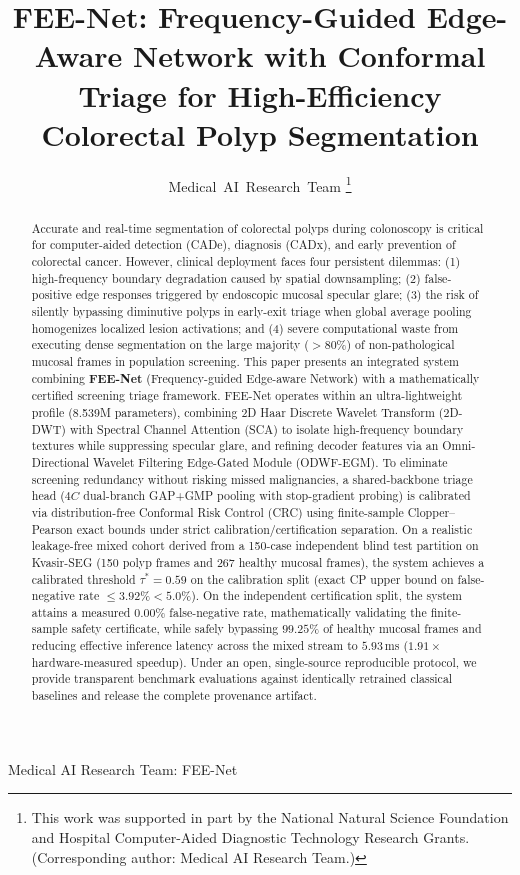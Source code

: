 \documentclass[journal]{IEEEtran}
\begin{document}
\title{FEE-Net: Frequency-Guided Edge-Aware Network with Conformal Triage for High-Efficiency Colorectal Polyp Segmentation}

\author{Medical~AI~Research~Team
\thanks{This work was supported in part by the National Natural Science Foundation and Hospital Computer-Aided Diagnostic Technology Research Grants. (Corresponding author: Medical AI Research Team.)}
}

%
{Medical AI Research Team: FEE-Net}

\maketitle

\begin{abstract}
Accurate and real-time segmentation of colorectal polyps during colonoscopy is critical for computer-aided detection (CADe), diagnosis (CADx), and early prevention of colorectal cancer. However, clinical deployment faces four persistent dilemmas: (1) high-frequency boundary degradation caused by spatial downsampling; (2) false-positive edge responses triggered by endoscopic mucosal specular glare; (3) the risk of silently bypassing diminutive polyps in early-exit triage when global average pooling homogenizes localized lesion activations; and (4) severe computational waste from executing dense segmentation on the large majority ($>80\%$) of non-pathological mucosal frames in population screening. This paper presents an integrated system combining \textbf{FEE-Net} (Frequency-guided Edge-aware Network) with a mathematically certified screening triage framework. FEE-Net operates within an ultra-lightweight profile (8.539M parameters), combining 2D Haar Discrete Wavelet Transform (2D-DWT) with Spectral Channel Attention (SCA) to isolate high-frequency boundary textures while suppressing specular glare, and refining decoder features via an Omni-Directional Wavelet Filtering Edge-Gated Module (ODWF-EGM). To eliminate screening redundancy without risking missed malignancies, a shared-backbone triage head ($4C$ dual-branch GAP+GMP pooling with stop-gradient probing) is calibrated via distribution-free Conformal Risk Control (CRC) using finite-sample Clopper--Pearson exact bounds under strict calibration/certification separation. On a realistic leakage-free mixed cohort derived from a 150-case independent blind test partition on Kvasir-SEG (150 polyp frames and 267 healthy mucosal frames), the system achieves a calibrated threshold $\tau^{*}=0.59$ on the calibration split (exact CP upper bound on false-negative rate $\le 3.92\% < 5.0\%$). On the independent certification split, the system attains a measured $0.00\%$ false-negative rate, mathematically validating the finite-sample safety certificate, while safely bypassing $99.25\%$ of healthy mucosal frames and reducing effective inference latency across the mixed stream to $5.93$\,ms ($1.91\times$ hardware-measured speedup). Under an open, single-source reproducible protocol, we provide transparent benchmark evaluations against identically retrained classical baselines and release the complete provenance artifact.
\end{abstract}
\end{document}
